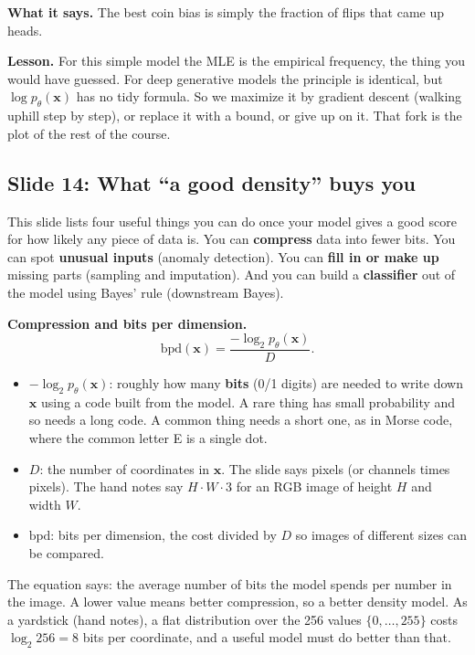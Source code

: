 \textbf{What it says.} The best coin bias is simply the fraction of flips that came up heads.

\textbf{Lesson.} For this simple model the MLE is the empirical frequency, the thing you would have guessed. For deep generative models the principle is identical, but $\log p_\theta(\mathbf{x})$ has no tidy formula. So we maximize it by gradient descent (walking uphill step by step), or replace it with a bound, or give up on it. That fork is the plot of the rest of the course.

\subsection*{Slide 14: What ``a good density'' buys you}

This slide lists four useful things you can do once your model gives a good score for how likely any piece of data is. You can \textbf{compress} data into fewer bits. You can spot \textbf{unusual inputs} (anomaly detection). You can \textbf{fill in or make up} missing parts (sampling and imputation). And you can build a \textbf{classifier} out of the model using Bayes' rule (downstream Bayes).

\textbf{Compression and bits per dimension.}
\[
\mathrm{bpd}(\mathbf{x})=\frac{-\log_2 p_\theta(\mathbf{x})}{D}.
\]
\begin{itemize}
\item $-\log_2 p_\theta(\mathbf{x})$: roughly how many \textbf{bits} (0/1 digits) are needed to write down $\mathbf{x}$ using a code built from the model. A rare thing has small probability and so needs a long code. A common thing needs a short one, as in Morse code, where the common letter E is a single dot.
\item $D$: the number of coordinates in $\mathbf{x}$. The slide says pixels (or channels times pixels). The hand notes say $H\cdot W\cdot 3$ for an RGB image of height $H$ and width $W$.
\item $\mathrm{bpd}$: bits per dimension, the cost divided by $D$ so images of different sizes can be compared.
\end{itemize}
The equation says: the average number of bits the model spends per number in the image. A lower value means better compression, so a better density model. As a yardstick (hand notes), a flat distribution over the 256 values $\{0,\dots,255\}$ costs $\log_2 256=8$ bits per coordinate, and a useful model must do better than that.

